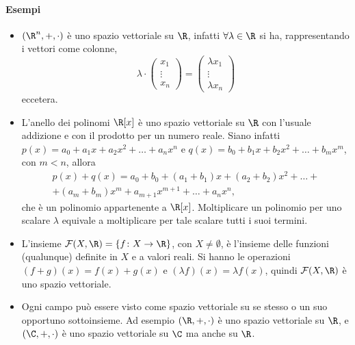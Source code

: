 \paragraph{Esempi}
\begin{itemize}
	\item $(\R^n,+,\cdot)$ è uno spazio vettoriale su $\R$, infatti $\forall\lambda\in\R$ si ha, rappresentando i vettori come colonne,
		\begin{equation*}
			\lambda\cdot
			\begin{pmatrix}
				x_1\\\vdots\\x_n
			\end{pmatrix}
			=
			\begin{pmatrix}
				\lambda x_1\\\vdots\\\lambda x_n
			\end{pmatrix}
		\end{equation*}
		eccetera.
	\item L'anello dei polinomi $\R[x]$ è uno spazio vettoriale su $\R$ con l'usuale addizione e con il prodotto per un numero reale.
		Siano infatti $p(x)=a_0+a_1x+a_2x^2+\dots+a_nx^n$ e $  q(x)=b_0+b_1x+b_2x^2+\dots+b_mx^m$, con $m<n$, allora
		\begin{multline*}
			p(x)+q(x)=a_0+b_0+(a_1+b_1)x+(a_2+b_2)x^2+\dots+\\+(a_m+b_m)x^m+a_{m+1}x^{m+1}+\dots+a_nx^n,
		\end{multline*}
		che è un polinomio appartenente a $\R[x]$.
		Moltiplicare un polinomio per uno scalare $\lambda$ equivale a moltiplicare per tale scalare tutti i suoi termini.
	\item L'insieme $\mathcal{F}(X,\R)=\{f\colon X\to\R\}$, con $X\neq\emptyset$, è l'insieme delle funzioni (qualunque) definite in $X$ e a valori reali.
		Si hanno le operazioni $(f+g)(x)=f(x)+g(x)$ e $(\lambda f)(x)=\lambda f(x)$, quindi $\mathcal{F}(X,\R)$ è uno spazio vettoriale.
	\item Ogni campo può essere visto come spazio vettoriale su se stesso o un suo opportuno sottoinsieme.
		Ad esempio $(\R,+,\cdot)$ è uno spazio vettoriale su $\R$, e $(\C,+,\cdot)$ è uno spazio vettoriale su $\C$ ma anche su $\R$.
\end{itemize}

